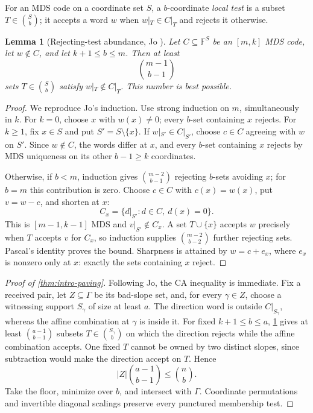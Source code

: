 \documentclass[11pt,a4paper]{amsart}
\numberwithin{equation}{section}
\newtheorem{lemma}[lemma]{Lemma}
\theoremstyle{remark}
\newcommand{\F}{\mathbb F}
\newcommand{\abs}[1]{\lvert #1\rvert}
\begin{document}
For an MDS code on a coordinate set \(S\), a \(b\)-coordinate
\emph{local test} is a subset \(T\in\binom Sb\); it accepts a word \(w\)
when \(w|_T\in C|_T\) and rejects it otherwise.
\begin{lemma}[Rejecting-test abundance, Jo
  {\cite[Lem.~4.1]{Jo26}}]\label{lem:rejecting-test-abundance}
Let \(C\subseteq\F^S\) be an \([m,k]\) MDS code, let \(w\notin C\), and let
\(k+1\le b\le m\).  Then at least
\[
                         \binom{m-1}{b-1}           \tag{2.3}
\]
sets \(T\in\binom Sb\) satisfy \(w|_T\notin C|_T\).  This number is
best possible.
\end{lemma}

\begin{proof}
We reproduce Jo's induction.  Use strong induction on \(m\), simultaneously
in \(k\).  For \(k=0\),
choose \(x\) with \(w(x)\ne0\); every \(b\)-set containing \(x\) rejects.
For \(k\ge1\), fix \(x\in S\) and put \(S'=S\setminus\{x\}\).
If \(w|_{S'}\in C|_{S'}\), choose \(c\in C\) agreeing with \(w\) on
\(S'\).  Since \(w\notin C\), the words differ at \(x\), and every
\(b\)-set containing \(x\) rejects by MDS uniqueness on its other
\(b-1\ge k\) coordinates.

Otherwise, if \(b<m\), induction gives \(\binom{m-2}{b-1}\) rejecting
\(b\)-sets avoiding \(x\); for \(b=m\) this contribution is zero.  Choose
\(c\in C\) with \(c(x)=w(x)\), put \(v=w-c\),
and shorten at \(x\):
\[
 C_x=\{d|_{S'}:d\in C,\ d(x)=0\}.
\]
This is \([m-1,k-1]\) MDS and \(v|_{S'}\notin C_x\).  A set
\(T\cup\{x\}\) accepts \(w\) precisely when \(T\) accepts \(v\) for
\(C_x\), so induction supplies \(\binom{m-2}{b-2}\) further rejecting
sets.  Pascal's identity proves the bound.  Sharpness is attained by
\(w=c+e_x\), where \(e_x\) is nonzero only at \(x\): exactly the sets
containing \(x\) reject.
\end{proof}

\begin{proof}[Proof of \cref{thm:intro-paving}]
Following Jo, the CA inequality is immediate.  Fix a received pair, let \(Z\subseteq\Gamma\)
be its bad-slope set, and, for every \(\gamma\in Z\), choose a witnessing support \(S_\gamma\) of
size at least \(a\).  The direction word is outside \(C|_{S_\gamma}\),
whereas the affine combination at \(\gamma\) is inside it.  For fixed
\(k+1\le b\le a\), \cref{lem:rejecting-test-abundance} gives at least
\(\binom{a-1}{b-1}\) subsets \(T\in\binom{S_\gamma}b\) on which the
direction rejects while the affine combination accepts.  One fixed \(T\)
cannot be owned by two distinct slopes, since subtraction would make the
direction accept on \(T\).  Hence
\[
                 \abs Z\binom{a-1}{b-1}\le\binom nb.       \tag{2.4}
\]
Take the floor, minimize over \(b\), and intersect with \(\Gamma\).
Coordinate permutations and invertible diagonal scalings preserve every
punctured membership test.
\end{proof}
\end{document}
